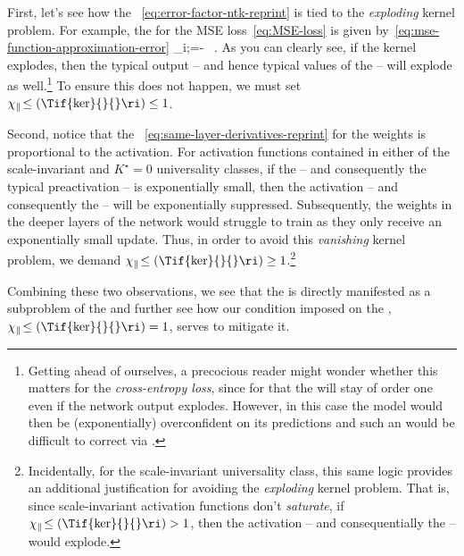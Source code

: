 First, let's see how the ~\eqref{eq:error-factor-ntk-reprint} is tied to the \emph{exploding} kernel problem.
For example, the  for the MSE loss~\eqref{eq:MSE-loss} is given by~\eqref{eq:mse-function-approximation-error}
\be\label{eq:mse-function-approximation-error-mlp}
\epsilon_{i;\alpha}=- \, .
\ee
As you can clearly see, if the kernel explodes, then the typical output -- and hence typical values of the  -- will explode as well.\footnote{Getting ahead of ourselves, a precocious reader might wonder whether this matters for the \emph{cross-entropy loss}, since for that  the  will stay of order one even if the network output explodes. However, in this case the model would then be (exponentially) overconfident on its predictions and such an  would be difficult to correct via .
}
To ensure this does not happen, we must set~$\chi_{\parallel}\!\le(\Tif{\ker}{}{}\ri)\leq1$.

Second, notice that the ~\eqref{eq:same-layer-derivatives-reprint} for the weights is proportional to the activation. For activation functions contained in either of the scale-invariant and $K^\star=0$ universality classes, if the  -- and consequently the typical preactivation -- is exponentially small, then the activation -- and consequently the  -- will be exponentially suppressed. Subsequently, the weights in the deeper layers of the network would struggle to train as they only receive an exponentially small update. Thus, in order to avoid this \emph{vanishing} kernel problem, we demand $\chi_{\parallel}\!\le(\Tif{\ker}{}{}\ri)\geq1$.\footnote{Incidentally, for the scale-invariant universality class, this same logic provides an additional justification for avoiding the \emph{exploding} kernel problem. That is, since scale-invariant activation functions don't \emph{saturate}, if $\chi_{\parallel}\!\le(\Tif{\ker}{}{}\ri)>1$, then the activation -- and consequentially the  -- would explode.}





Combining these two observations,  we see that the  is directly manifested as a subproblem of the  and further see how our  condition imposed on the , $\chi_{\parallel}\!\le(\Tif{\ker}{}{}\ri)=1$, serves to mitigate it.





